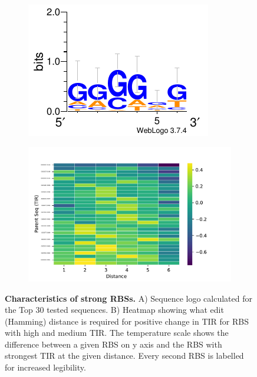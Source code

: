 \documentclass{article}
\begin{document}
\begin{figure}[!t]
     \centering
     \begin{subfigure}[b]{0.49\textwidth}
         \centering
         \caption{}
         \includegraphics[scale=1.2]{plots/Main_Paper/TOP30_logo.pdf}
     \end{subfigure}
     \hfill
     \begin{subfigure}[b]{0.49\textwidth}
         \centering
         \caption{}
         \includegraphics[scale=0.5]{plots/Main_Paper/Hd_Heatmap.pdf}
     \end{subfigure}
     \caption{\textbf{Characteristics of strong RBSs.} A) Sequence logo calculated for the Top 30 tested sequences. B) Heatmap showing what edit (Hamming) distance is required for positive change in TIR for RBS with high and medium TIR. The temperature scale shows the difference between a given RBS on y axis and the RBS with strongest TIR at the given distance. Every second RBS is labelled for increased legibility. }
     \label{fig:Library characteristics}
\end{figure}
\end{document}
